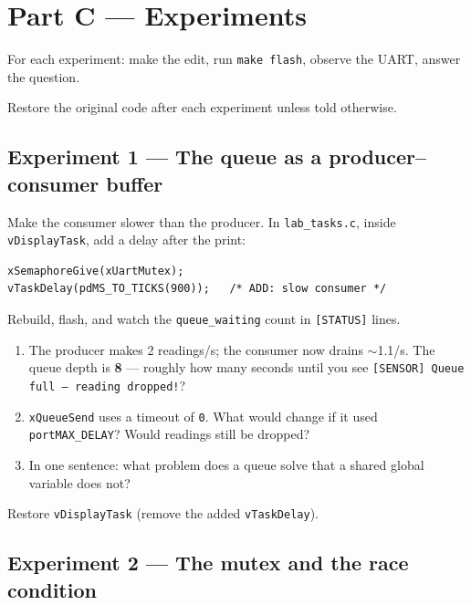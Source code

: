 \documentclass[11pt, a4paper]{article}
\newcommand{\file}[1]{\texttt{\small #1}}
\newcommand{\api}[1]{\texttt{\small #1}}
\begin{document}
\section{Part C --- Experiments}

For each experiment: make the edit, run \texttt{make flash}, observe the UART, answer
the question.

\begin{warnbox}
  Restore the original code after each experiment unless told otherwise.
\end{warnbox}

\subsection{Experiment 1 --- The queue as a producer--consumer buffer}

Make the consumer slower than the producer.
In \file{lab\_tasks.c}, inside \texttt{vDisplayTask}, add a delay after the print:

\begin{lstlisting}[style=cstyle]
xSemaphoreGive(xUartMutex);
vTaskDelay(pdMS_TO_TICKS(900));   /* ADD: slow consumer */
\end{lstlisting}

Rebuild, flash, and watch the \texttt{queue\_waiting} count in \texttt{[STATUS]} lines.

\begin{questionbox}[~1]
  \begin{enumerate}[label=(\alph*), noitemsep, leftmargin=*]
    \item The producer makes 2 readings/s; the consumer now drains $\sim$1.1/s.
          The queue depth is \textbf{8} --- roughly how many seconds until you see
          \texttt{[SENSOR] Queue full --- reading dropped!}?
    \item \api{xQueueSend} uses a timeout of \texttt{0}.  What would change if it
          used \api{portMAX\_DELAY}?  Would readings still be dropped?
    \item In one sentence: what problem does a queue solve that a shared global
          variable does not?
  \end{enumerate}
\end{questionbox}

Restore \texttt{vDisplayTask} (remove the added \api{vTaskDelay}).

\subsection{Experiment 2 --- The mutex and the race condition}
\end{document}
